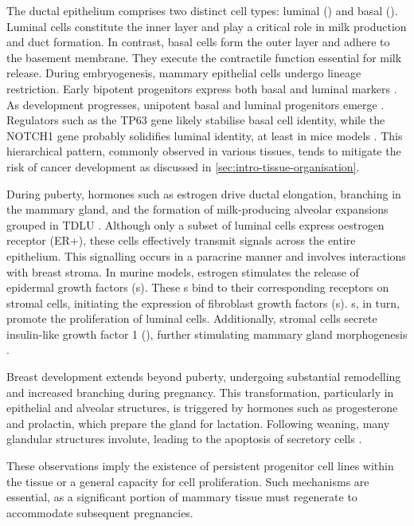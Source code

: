 The ductal epithelium comprises two distinct cell types: luminal () and basal (). Luminal cells constitute the inner layer and play a critical role in milk production and duct formation. In contrast, basal cells form the outer layer and adhere to the basement membrane. They execute the contractile function essential for milk release. During embryogenesis, mammary epithelial cells undergo lineage restriction. Early bipotent progenitors express both basal and luminal markers \parencite{Stingl2001-cb,Prater2014-qd,Rios2014-jj}. As development progresses, unipotent basal and luminal progenitors emerge \parencite{Van_Keymeulen2011-um,Rios2014-jj,Tao2014-ol}. Regulators such as the TP63 gene likely stabilise basal cell identity, while the NOTCH1 gene probably solidifies luminal identity, at least in mice models  \parencite{Spina2021-ej}. This hierarchical pattern, commonly observed in various tissues, tends to mitigate the risk of cancer development as discussed in \cref{sec:intro-tissue-organisation}.

During puberty, hormones such as estrogen drive ductal elongation, branching in the mammary gland, and the formation of milk-producing alveolar expansions grouped in \acf{TDLU} . Although only a subset of luminal cells express oestrogen receptor (ER+), these cells effectively transmit signals across the entire epithelium. This signalling occurs in a paracrine manner and involves interactions with breast stroma.
In murine models, estrogen stimulates the release of epidermal growth factors (s). These s bind to their corresponding receptors on stromal cells, initiating the expression of fibroblast growth factors (s). s, in turn, promote the proliferation of luminal cells. Additionally, stromal cells secrete insulin-like growth factor 1 (), further stimulating mammary gland morphogenesis \parencite{Macias2012-su}.

Breast development extends beyond puberty, undergoing substantial remodelling and increased branching during pregnancy. This transformation, particularly in epithelial and alveolar structures, is triggered by hormones such as progesterone and prolactin, which prepare the gland for lactation. Following weaning, many glandular structures involute, leading to the apoptosis of secretory cells \parencite{Macias2012-su}.

These observations imply the existence of persistent progenitor cell lines within the tissue or a general capacity for cell proliferation. Such mechanisms are essential, as a significant portion of mammary tissue must regenerate to accommodate subsequent pregnancies.

